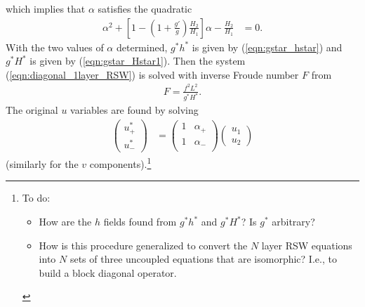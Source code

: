\documentclass[10pt,reqno]{amsart}
\begin{document}
which implies that $\alpha$ satisfies the quadratic
\begin{align}
\alpha^2 + \left[ 1 - \left( 1 + \frac{g'}{g} \right) \frac{H_2}{H_1}  \right] \alpha - \frac{H_2}{H_1} & = 0 .
\end{align}
With the two values of $\alpha$ determined, $g^* h^*$ is given by (\ref{eqn:gstar_hstar}) and $g^* H^*$ is given by (\ref{eqn:gstar_Hstar1}).
Then the system (\ref{eqn:diagonal_1layer_RSW}) is solved with inverse Froude number $F$ from 
\begin{align}
F = \frac{f^2 L^2}{g^* H^*} .
\end{align}
The original $u$ variables are found by solving
\begin{align}
\begin{pmatrix}
u^*_+ \\
u^*_-
\end{pmatrix} & = 
\begin{pmatrix}
1 & \alpha_+ \\
1 & \alpha_- \\
\end{pmatrix}
\begin{pmatrix}
u_1 \\
u_2
\end{pmatrix}
\end{align}
(similarly for the $v$ components).\footnote{To do: \begin{itemize} \item How are the $h$ fields found from $g^* h^*$ and $g^* H^*$?  Is $g^*$ arbitrary? 
\item How is this procedure generalized to convert the $N$ layer RSW equations into $N$ sets of three uncoupled equations that are isomorphic?  I.e., to build a block diagonal operator.
\end{itemize}}
\end{document}
